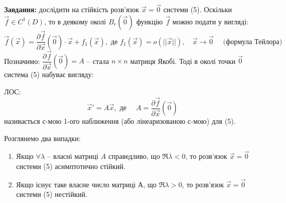 \documentclass[14pt,a4paper]{scrartcl}
\theoremstyle{definition}
\theoremstyle{definition}
\theoremstyle{definition}
\begin{document}
\textbf{Завдання: } дослідити на стійкість розв'язок $\overrightarrow{x} = \overrightarrow{0}$ системи (5). Оскільки $\overrightarrow{f} \in C^1(D)$, то в деякому околі $B_r(\overrightarrow{0})$ функцію $\overrightarrow{f}$ можно подати у вигляді:
\begin{equation*}
  \overrightarrow{f}(\overrightarrow{x}) = \dfrac{\partial \overrightarrow{f}}{\partial \overrightarrow{x}}(\overrightarrow{0}) \cdot \overrightarrow{x} + f_1(\overrightarrow{x}), \text{ де } f_1(\overrightarrow{x}) = o(||\overrightarrow{x}||), \quad \overrightarrow{x} \rightarrow \overrightarrow{0} \quad \text{ (формула Тейлора)}
\end{equation*}
Позначимо: $\dfrac{\partial \overrightarrow{f}}{\partial \overrightarrow{x}}(\overrightarrow{0}) = A$ -- стала $n \times n$ матриця Якобі. Тоді в околі точки $\overrightarrow{0}$ система (5) набуває вигляду:
\begin{center}
\end{center}
 ЛОС:
\begin{equation*}
  \overrightarrow{x}' = A\overrightarrow{x}, \text{ де } \quad A = \dfrac{\partial\overrightarrow{f}}{\partial\overrightarrow{x}}(\overrightarrow{0})
\end{equation*}
називається с-мою 1-ого наближення (або лінеаризованою с-мою) для (5).

\begin{boxteo}
  Розглянемо два випадки:
  \begin{enumerate}
    \item Якщо $\forall \lambda$ -- власні матриці $A$ справедливо, що $\Re \lambda < 0$, то розв'язок $\overrightarrow{x} = \overrightarrow{0}$ системи (5) асимптотично стійкий.
    \item Якщо існує таке власне число матриці $А$, що $\Re \lambda > 0$, то розв'язок $\overrightarrow{x} = \overrightarrow{0}$ системи (5) нестійкий.
  \end{enumerate}
\end{boxteo}
\end{document}
